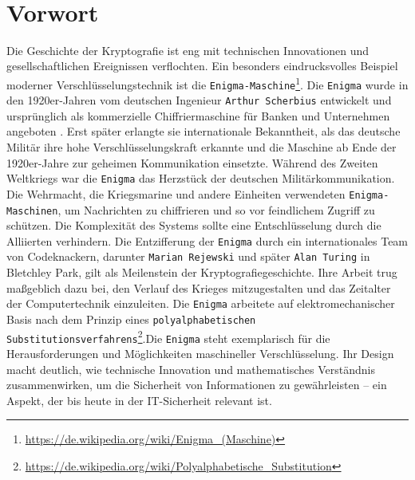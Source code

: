 \documentclass[a4paper,12pt]{scrartcl}
\begin{document}
\iftitlepage
  
  \maketitle

  \thispagestyle{empty}
  \newpage
  ~
  \thispagestyle{empty}
  \newpage
\fi

\ifcompetencepage
  

  \thispagestyle{empty}
  \newpage
\fi

\ifobjectivepage
  

  \thispagestyle{empty}
  \newpage
\fi

\ifhintspage
  

  \thispagestyle{empty}
  \newpage
\fi

\ifsoftwarepage
  

  \thispagestyle{empty}
  \newpage
\fi

\section*{Vorwort}
Die Geschichte der Kryptografie ist eng mit technischen Innovationen und gesellschaftlichen Ereignissen verflochten. Ein besonders eindrucksvolles Beispiel moderner Verschlüsselungstechnik ist die \texttt{Enigma-Maschine}\footnote{\url{https://de.wikipedia.org/wiki/Enigma_(Maschine)}}. Die \texttt{Enigma} wurde in den 1920er-Jahren vom deutschen Ingenieur \texttt{Arthur Scherbius} entwickelt und ursprünglich als kommerzielle Chiffriermaschine für Banken und Unternehmen angeboten \parencite{copeland2017}. Erst später erlangte sie internationale Bekanntheit, als das deutsche Militär ihre hohe Verschlüsselungskraft erkannte und die Maschine ab Ende der 1920er-Jahre zur geheimen Kommunikation einsetzte. Während des Zweiten Weltkriegs war die \texttt{Enigma} das Herzstück der deutschen Militärkommunikation. Die Wehrmacht, die Kriegsmarine und andere Einheiten verwendeten \texttt{Enigma-Maschinen}, um Nachrichten zu chiffrieren und so vor feindlichem Zugriff zu schützen. Die Komplexität des Systems sollte eine Entschlüsselung durch die Alliierten verhindern. Die Entzifferung der \texttt{Enigma} durch ein internationales Team von Codeknackern, darunter \texttt{Marian Rejewski} und später \texttt{Alan Turing} in Bletchley Park, gilt als Meilenstein der Kryptografiegeschichte. Ihre Arbeit trug maßgeblich dazu bei, den Verlauf des Krieges mitzugestalten und das Zeitalter der Computertechnik einzuleiten. Die \texttt{Enigma} arbeitete auf elektromechanischer Basis nach dem Prinzip eines \texttt{polyalphabetischen Substitutionsverfahrens}\footnote{\url{https://de.wikipedia.org/wiki/Polyalphabetische_Substitution}}.Die \texttt{Enigma} steht exemplarisch für die Herausforderungen und Möglichkeiten maschineller Verschlüsselung. Ihr Design macht deutlich, wie technische Innovation und mathematisches Verständnis zusammenwirken, um die Sicherheit von Informationen zu gewährleisten – ein Aspekt, der bis heute in der IT-Sicherheit relevant ist.
\end{document}
